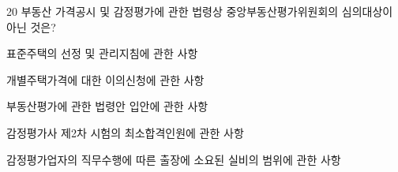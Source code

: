 \begin{question}{20}
부동산 가격공시 및 감정평가에 관한 법령상 중앙부동산평가위원회의 심의대상이 아닌 것은?
\begin{choices}
  \item 표준주택의 선정 및 관리지침에 관한 사항
  \item 개별주택가격에 대한 이의신청에 관한 사항
  \item 부동산평가에 관한 법령안 입안에 관한 사항
  \item 감정평가사 제2차 시험의 최소합격인원에 관한 사항
  \item 감정평가업자의 직무수행에 따른 출장에 소요된 실비의 범위에 관한 사항
\end{choices}
\end{question}
